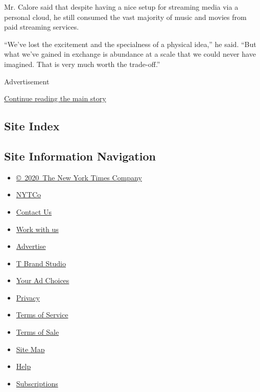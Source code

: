 Mr. Calore said that despite having a nice setup for streaming media via
a personal cloud, he still consumed the vast majority of music and
movies from paid streaming services.

``We've lost the excitement and the specialness of a physical idea,'' he
said. ``But what we've gained in exchange is abundance at a scale that
we could never have imagined. That is very much worth the trade-off.''

Advertisement

\protect\hyperlink{after-bottom}{Continue reading the main story}

\hypertarget{site-index}{%
\subsection{Site Index}\label{site-index}}

\hypertarget{site-information-navigation}{%
\subsection{Site Information
Navigation}\label{site-information-navigation}}

\begin{itemize}
\tightlist
\item
  \href{https://help.nytimes3xbfgragh.onion/hc/en-us/articles/115014792127-Copyright-notice}{©~2020~The
  New York Times Company}
\end{itemize}

\begin{itemize}
\tightlist
\item
  \href{https://www.nytco.com/}{NYTCo}
\item
  \href{https://help.nytimes3xbfgragh.onion/hc/en-us/articles/115015385887-Contact-Us}{Contact
  Us}
\item
  \href{https://www.nytco.com/careers/}{Work with us}
\item
  \href{https://nytmediakit.com/}{Advertise}
\item
  \href{http://www.tbrandstudio.com/}{T Brand Studio}
\item
  \href{https://www.nytimes3xbfgragh.onion/privacy/cookie-policy\#how-do-i-manage-trackers}{Your
  Ad Choices}
\item
  \href{https://www.nytimes3xbfgragh.onion/privacy}{Privacy}
\item
  \href{https://help.nytimes3xbfgragh.onion/hc/en-us/articles/115014893428-Terms-of-service}{Terms
  of Service}
\item
  \href{https://help.nytimes3xbfgragh.onion/hc/en-us/articles/115014893968-Terms-of-sale}{Terms
  of Sale}
\item
  \href{https://spiderbites.nytimes3xbfgragh.onion}{Site Map}
\item
  \href{https://help.nytimes3xbfgragh.onion/hc/en-us}{Help}
\item
  \href{https://www.nytimes3xbfgragh.onion/subscription?campaignId=37WXW}{Subscriptions}
\end{itemize}
